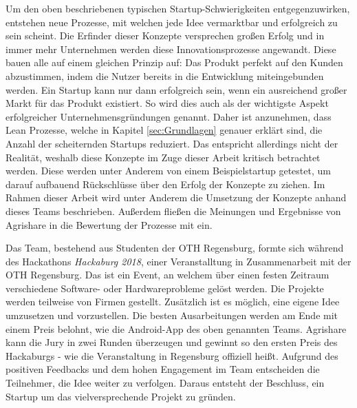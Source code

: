 Um den oben beschriebenen typischen Startup-Schwierigkeiten entgegenzuwirken, entstehen neue Prozesse, mit welchen jede Idee vermarktbar und erfolgreich zu sein scheint. Die Erfinder dieser Konzepte versprechen großen Erfolg und in immer mehr Unternehmen werden diese Innovationsprozesse angewandt. Diese bauen alle auf einem gleichen Prinzip auf: Das Produkt perfekt auf den Kunden abzustimmen, indem die Nutzer bereits in die Entwicklung miteingebunden werden. Ein Startup kann nur dann erfolgreich sein, wenn ein ausreichend großer Markt für das Produkt existiert. So wird dies auch als der wichtigste Aspekt erfolgreicher Unternehmensgründungen genannt. Daher ist anzunehmen, dass Lean Prozesse, welche in Kapitel \ref{sec:Grundlagen} genauer erklärt sind, die Anzahl der scheiternden Startups reduziert. Das entspricht allerdings nicht der Realität, weshalb diese Konzepte im Zuge dieser Arbeit kritisch betrachtet werden.\cite{patel201590} Diese werden unter Anderem von einem Beispielstartup getestet, um darauf aufbauend Rückschlüsse über den Erfolg der Konzepte zu ziehen. Im Rahmen dieser Arbeit wird unter Anderem die Umsetzung der Konzepte anhand dieses Teams beschrieben. Außerdem fließen die Meinungen und Ergebnisse von Agrishare in die Bewertung der Prozesse mit ein.

Das Team, bestehend aus Studenten der OTH Regensburg, formte sich während des Hackathons \textit{Hackaburg 2018}, einer Veranstalltung in Zusammenarbeit mit der OTH Regensburg. Das ist ein Event, an welchem über einen festen Zeitraum verschiedene Software- oder Hardwareprobleme gelöst werden. Die Projekte werden teilweise von Firmen gestellt. Zusätzlich ist es möglich, eine eigene Idee umzusetzen und vorzustellen. Die besten Ausarbeitungen werden am Ende mit einem Preis belohnt, wie die Android-App des oben genannten Teams. Agrishare kann die Jury in zwei Runden überzeugen und gewinnt so den ersten Preis des Hackaburgs - wie die Veranstaltung in Regensburg offiziell heißt. Aufgrund des positiven Feedbacks und dem hohen Engagement im Team entscheiden die Teilnehmer, die Idee weiter zu verfolgen. Daraus entsteht der Beschluss, ein Startup um das vielversprechende Projekt zu gründen.

\newpage

